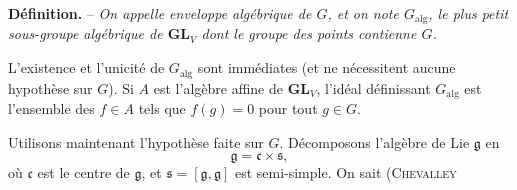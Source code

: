\textbf{Définition.} -- \textit{On appelle enveloppe algébrique de $G$, et on note $G_{\mathrm{alg}}$, le plus petit sous-groupe algébrique de $\mathbf{GL}_V$ dont le groupe des points contienne $G$.}

L’existence et l’unicité de $G_{\mathrm{alg}}$ sont immédiates (et ne nécessitent aucune hypothèse sur $G$). Si $A$ est l’algèbre affine de $\mathbf{GL}_V$, l’idéal définissant $G_{\mathrm{alg}}$ est l’ensemble des $f\in A$ tels que $f(g)=0$ pour tout $g\in G$.

Utilisons maintenant l’hypothèse faite sur $G$. Décomposons l’algèbre de Lie $\mathfrak{g}$ en
\[
\mathfrak{g}=\mathfrak{c}\times\mathfrak{s},
\]
où $\mathfrak{c}$ est le centre de $\mathfrak{g}$, et $\mathfrak{s}=[\mathfrak{g},\mathfrak{g}]$ est semi-simple. On sait (\textsc{Chevalley}
